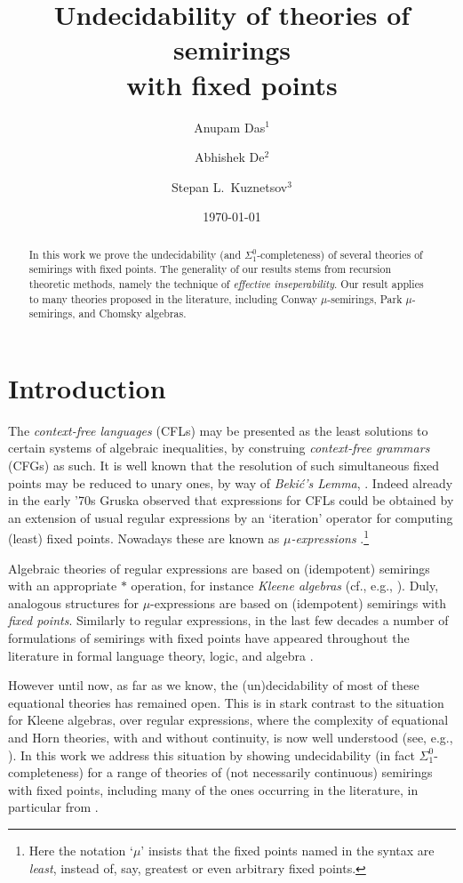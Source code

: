 \documentclass[runningheads]{amsart}
\title[Undecidability of theories of semirings with fixed points]{Undecidability of theories of semirings \\ with fixed points}
\author{Anupam Das$^1$}
\author{Abhishek De$^2$}
\author{Stepan L.\ Kuznetsov$^3$}
\date{\today}
\begin{document}
\begin{abstract}
    In this work we prove the undecidability (and $\Sigma^0_1$-completeness) of several theories of semirings with fixed points. 
    The generality of our results stems from recursion theoretic methods, namely the technique of \emph{effective inseperability}.
    Our result applies to many theories proposed in the literature, including Conway $\mu$-semirings, Park $\mu$-semirings, and Chomsky algebras.
\end{abstract}

\maketitle

\section{Introduction}

The \emph{context-free languages} (CFLs) may be presented as the least solutions to certain systems of algebraic inequalities, by construing \emph{context-free grammars} (CFGs) as such. 
It is well known that the resolution of such simultaneous fixed points may be reduced to unary ones, by way of \emph{Beki\'c's Lemma}, \cite{Bekic84}.
Indeed already in the early '70s
Gruska observed that expressions for CFLs could be obtained by an extension of usual regular expressions by an `iteration' operator for computing (least) fixed points.
Nowadays these are known as \emph{$\mu$-expressions} \cite{Leiss92:ka-with-recursion,EsikLeiss02,EsikLeiss05}.\footnote{Here the notation `$\mu$' insists that the fixed points named in the syntax are \emph{least}, instead of, say, greatest or even arbitrary fixed points.}

Algebraic theories of regular expressions are based on (idempotent) semirings with an appropriate $*$ operation, for instance \emph{Kleene algebras} (cf., e.g., \cite{Kozen94}). 
Duly, analogous structures for $\mu$-expressions are based on (idempotent) semirings with \emph{fixed points}.
Similarly to regular expressions, in the last few decades
a number of formulations of semirings with {fixed points} have appeared throughout the literature in formal language theory, logic, and algebra \cite{Courcelle86,Leiss92:ka-with-recursion,EsikLeiss02,EsikLeiss05,Hopkins08:alg-approach-1,Hopkins08:alg-approach-2,EsikKuich12:mod-aut-theory,GHK13,Leiss16}.

However until now, as far as we know, the (un)decidability of most of these equational theories has remained open.
This is in stark contrast to the situation for Kleene algebras, over regular expressions, where the complexity of equational and Horn theories, with and without continuity, is now well understood (see, e.g., \cite{Kozen02:complexity-ka,DKPP19:ka-with-hyps}).
In this work we address this situation by showing undecidability (in fact $\Sigma^0_1$-completeness) for a range of theories of (not necessarily continuous) semirings with fixed points, including many of the ones occurring in the literature, in particular from \cite{Leiss92:ka-with-recursion,EsikLeiss02,EsikLeiss05,GHK13}.
\end{document}
